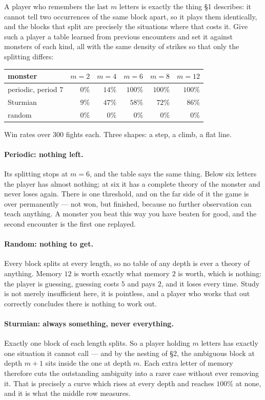 \documentclass[11pt,a4paper]{article}
\theoremstyle{definition}
\theoremstyle{plain}
\begin{document}
A player who remembers the last $m$ letters is exactly the thing \S1 describes:
it cannot tell two occurrences of the same block apart, so it plays them
identically, and the blocks that split are precisely the situations where that
costs it. Give such a player a table learned from previous encounters and set it
against monsters of each kind, all with the same density of strikes so that only
the splitting differs:

\begin{center}
\begin{tabular}{lrrrrr}
\toprule
monster & $m=2$ & $m=4$ & $m=6$ & $m=8$ & $m=12$ \\ \midrule
periodic, period $7$ & $0\%$ & $14\%$ & $100\%$ & $100\%$ & $100\%$ \\
Sturmian             & $9\%$ & $47\%$ & $58\%$  & $72\%$  & $86\%$ \\
random               & $0\%$ & $0\%$  & $0\%$   & $0\%$   & $0\%$ \\
\bottomrule
\end{tabular}
\end{center}

\noindent
Win rates over $300$ fights each. Three shapes: a step, a climb, a flat line.

\paragraph{Periodic: nothing left.} Its splitting stops at $m = 6$, and the
table says the same thing. Below six letters the player has almost nothing;
at six it has a complete theory of the monster and never loses again. There is
one threshold, and on the far side of it the game is over permanently --- not
won, but finished, because no further observation can teach anything. A monster
you beat this way you have beaten for good, and the second encounter is the
first one replayed.

\paragraph{Random: nothing to get.} Every block splits at every length, so no
table of any depth is ever a theory of anything. Memory $12$ is worth exactly
what memory $2$ is worth, which is nothing: the player is guessing, guessing
costs $5$ and pays $2$, and it loses every time. Study is not merely
insufficient here, it is pointless, and a player who works that out correctly
concludes there is nothing to work out.

\paragraph{Sturmian: always something, never everything.} Exactly one block of
each length splits. So a player holding $m$ letters has exactly one situation it
cannot call --- and by the nesting of \S2, the ambiguous block at depth $m+1$
sits inside the one at depth $m$. Each extra letter of memory therefore cuts the
outstanding ambiguity into a rarer case without ever removing it. That is
precisely a curve which rises at every depth and reaches $100\%$ at none, and it
is what the middle row measures.
\end{document}
